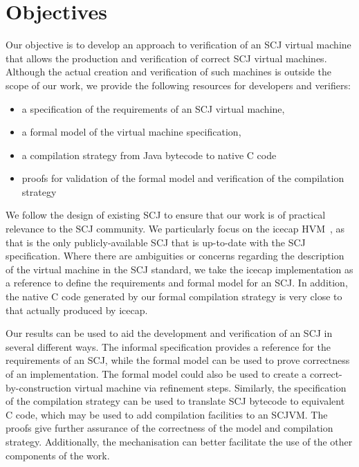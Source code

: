 \section{Objectives}

Our objective is to develop an approach to verification of an SCJ
virtual machine that allows the production and verification of correct
SCJ virtual machines.
Although the actual creation and verification of such machines is
outside the scope of our work, we provide the following resources for
developers and verifiers:
\begin{itemize}
\item a specification of the requirements of an SCJ virtual machine,
\item a formal model of the virtual machine specification,
\item a compilation strategy from Java bytecode to native C code
\item proofs for validation of the formal model and verification of
  the compilation strategy
\end{itemize}

We follow the design of existing SCJ to ensure that our work is of practical relevance to the
SCJ community.
We particularly focus on the icecap HVM~\cite{sondergaard2012}, as
that is the only publicly-available SCJ that is
up-to-date with the SCJ specification.
Where there are ambiguities or concerns regarding the description of
the virtual machine in the SCJ standard, we take the icecap
implementation as a reference to define the requirements and formal
model for an SCJ.
In addition, the native C code generated by our formal compilation
strategy is very close
to that actually produced by icecap.

Our results can be used to aid the development and verification of an
SCJ in several different ways.
The informal specification provides a reference for the requirements
of an SCJ, while the formal model
can be used to prove correctness of an implementation.
The formal model could also be used to create a
correct-by-construction virtual machine via refinement steps.
Similarly, the specification of the compilation strategy can be used
to translate SCJ bytecode to equivalent C code, which may be used to
add compilation facilities to an SCJVM.
The proofs give further assurance of the correctness of the model and
compilation strategy.
Additionally, the mechanisation can better facilitate the use of the
other components of the work.


